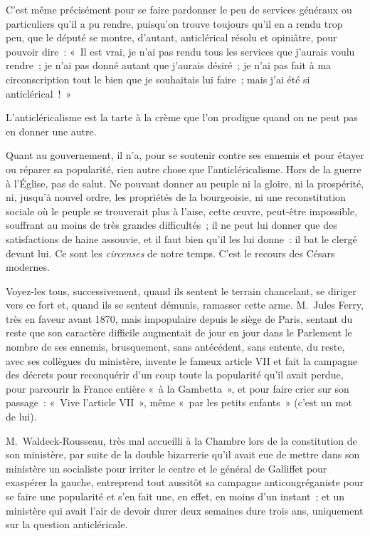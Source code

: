 \documentclass[french,twoside]{book} %
\begin{document}
C’est même précisément pour se faire pardonner le peu de services généraux ou particuliers qu’il a pu rendre, puisqu’on trouve toujours qu’il en a rendu trop peu, que le député se montre, d’autant, anticlérical résolu et opiniâtre, pour pouvoir dire : « Il est vrai, je n’ai pas rendu tous les services que j’aurais voulu rendre ; je n’ai pas donné autant que j’aurais désiré ; je n’ai pas fait à ma circonscription tout le bien que je souhaitais lui faire ; mais j’ai été si anticlérical ! »\par
L’anticléricalisme est la tarte à la crème que l’on prodigue quand on ne peut pas en donner une autre.\par
Quant au gouvernement, il n’a, pour se soutenir contre ses ennemis et pour étayer ou réparer sa popularité, rien autre chose que l’anticléricalisme. Hors de la guerre à l’Église, pas de salut. Ne pouvant donner au peuple ni la gloire, ni la prospérité, ni, jusqu’à nouvel ordre, les propriétés de la  bourgeoisie, ni une reconstitution sociale où le peuple se trouverait plus à l’aise, cette œuvre, peut-être impossible, souffrant au moins de très grandes difficultés ; il ne peut lui donner que des satisfactions de haine assouvie, et il faut bien qu’il les lui donne : il bat le clergé devant lui. Ce sont les {\itshape circenses} de notre temps. C’est le recours des Césars modernes.\par
Voyez-les tous, successivement, quand ils sentent le terrain chancelant, se diriger vers ce fort et, quand ils se sentent démunis, ramasser cette arme. M. Jules Ferry, très en faveur avant 1870, mais impopulaire depuis le siège de Paris, sentant du reste que son caractère difficile augmentait de jour en jour dans le Parlement le nombre de ses ennemis, brusquement, sans antécédent, sans entente, du reste, avec ses collègues du ministère, invente le fameux article VII et fait la campagne des décrets pour reconquérir d’un coup toute la popularité qu’il avait perdue, pour parcourir la France entière « à la Gambetta », et pour faire crier sur son passage : « Vive l’article VII », même « par les petits enfants » (c’est un mot de lui).\par
M. Waldeck-Rousseau, très mal accueilli à la Chambre lors de la constitution de son ministère, par suite de la double bizarrerie qu’il avait eue de mettre dans son ministère un socialiste pour  irriter le centre et le général de Galliffet pour exaspérer la gauche, entreprend tout aussitôt sa campagne anticongréganiste pour se faire une popularité et s’en fait une, en effet, en moins d’un instant ; et un ministère qui avait l’air de devoir durer deux semaines dure trois ans, uniquement sur la question anticléricale.\par
\end{document}
